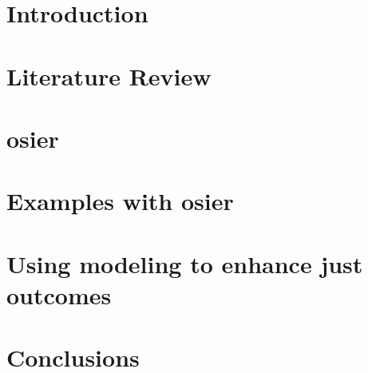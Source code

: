 \chapter{Introduction}
\chapter{Literature Review}
\chapter{\acs{osier}}
\chapter{Examples with \acs{osier}}
\chapter{Using modeling to enhance just outcomes}
\chapter{Conclusions}